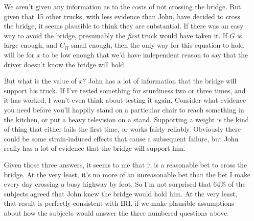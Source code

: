 \documentclass[oneside]{book}
\begin{document}
We aren't given any information as to the costs of not crossing the bridge. But given that 15 other trucks, with less evidence than John, have decided to cross the bridge, it seems plausible to think they are substantial. If there was an easy way to avoid the bridge, presumably the \textit{first} truck would have taken it. If $G$ is large enough, and $C_H$ small enough, then the only way for this equation to hold will be for $x$ to be low enough that we'd have independent reason to say that the driver doesn't know the bridge will hold.

But what is the value of $x$? John has a lot of information that the bridge will support his truck. If I've tested something for sturdiness two or three times, and it has worked, I won't even think about testing it again. Consider what evidence you need before you'll happily stand on a particular chair to reach something in the kitchen, or put a heavy television on a stand. Supporting a weight is the kind of thing that either fails the first time, or works fairly reliably. Obviously there could be some strain-induced effects that cause a subsequent failure, but John really has a lot of evidence that the bridge will support him.

Given those three answers, it seems to me that it is a reasonable bet to cross the bridge. At the very least, it's no more of an unreasonable bet than the bet I make every day crossing a busy highway by foot. So I'm not surprised that 64\% of the subjects agreed that John knew the bridge would hold him. At the very least, that result is perfectly consistent with IRI, if we make plausible assumptions about how the subjects would answer the three numbered questions above.
\end{document}
